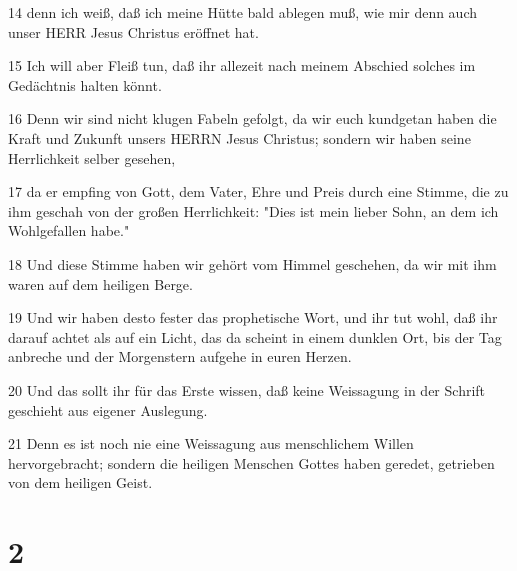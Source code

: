 \par 14 denn ich weiß, daß ich meine Hütte bald ablegen muß, wie mir denn auch unser HERR Jesus Christus eröffnet hat.
\par 15 Ich will aber Fleiß tun, daß ihr allezeit nach meinem Abschied solches im Gedächtnis halten könnt.
\par 16 Denn wir sind nicht klugen Fabeln gefolgt, da wir euch kundgetan haben die Kraft und Zukunft unsers HERRN Jesus Christus; sondern wir haben seine Herrlichkeit selber gesehen,
\par 17 da er empfing von Gott, dem Vater, Ehre und Preis durch eine Stimme, die zu ihm geschah von der großen Herrlichkeit: "Dies ist mein lieber Sohn, an dem ich Wohlgefallen habe."
\par 18 Und diese Stimme haben wir gehört vom Himmel geschehen, da wir mit ihm waren auf dem heiligen Berge.
\par 19 Und wir haben desto fester das prophetische Wort, und ihr tut wohl, daß ihr darauf achtet als auf ein Licht, das da scheint in einem dunklen Ort, bis der Tag anbreche und der Morgenstern aufgehe in euren Herzen.
\par 20 Und das sollt ihr für das Erste wissen, daß keine Weissagung in der Schrift geschieht aus eigener Auslegung.
\par 21 Denn es ist noch nie eine Weissagung aus menschlichem Willen hervorgebracht; sondern die heiligen Menschen Gottes haben geredet, getrieben von dem heiligen Geist.

\chapter{2}

